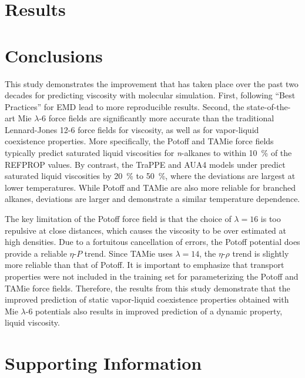 \documentclass[preprint,review,12pt]{elsarticle}
\begin{document}
	\section{Results} \label{Results}    
	
	
	\section{Conclusions} \label{Conclusions}
	
	This study demonstrates the improvement that has taken place over the past two decades for predicting viscosity with molecular simulation. First, following ``Best Practices'' for EMD lead to more reproducible results. Second, the state-of-the-art Mie $\lambda$-6 force fields are significantly more accurate than the traditional Lennard-Jones 12-6 force fields for viscosity, as well as for vapor-liquid coexistence properties. More specifically, the Potoff and TAMie force fields typically predict saturated liquid viscosities for \textit{n}-alkanes to within 10~\% of the REFPROP values. By contrast, the TraPPE and AUA4 models under predict saturated liquid viscosities by 20~\% to 50~\%, where the deviations are largest at lower temperatures. While Potoff and TAMie are also more reliable for branched alkanes, deviations are larger and demonstrate a similar temperature dependence. 
	
	The key limitation of the Potoff force field is that the choice of $\lambda = 16$ is too repulsive at close distances, which causes the viscosity to be over estimated at high densities. Due to a fortuitous cancellation of errors, the Potoff potential does provide a reliable $\eta$-$P$ trend. Since TAMie uses $\lambda =14$, the $\eta$-$\rho$ trend is slightly more reliable than that of Potoff. It is important to emphasize that transport properties were not included in the training set for parameterizing the Potoff and TAMie force fields. Therefore, the results from this study demonstrate that the improved prediction of static vapor-liquid coexistence properties obtained with Mie $\lambda$-6 potentials also results in improved prediction of a dynamic property, liquid viscosity.
	
	
	\section*{Supporting Information}
	
\end{document}
